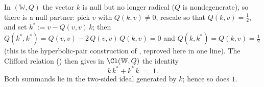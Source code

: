 In $(\mathbb{W}, Q)$ the vector $k$ is null but no longer radical ($Q$ is nondegenerate), so there is a null partner: pick $v$ with $Q(k, v) \neq 0$, rescale so that $Q(k,v) = \tfrac12$, and set $k^* := v - Q(v,v)\,k$; then $Q(k^*, k^*) = Q(v,v) - 2\,Q(v,v)\,Q(k,v) = 0$ and $Q(k, k^*) = Q(k,v) = \tfrac12$ (this is the hyperbolic-pair construction of \cite[\S 2.2]{ButlerT1}, reproved here in one line). The Clifford relation () then gives in $\Cl(\mathbb{W}, Q)$ the identity
\[
k\,k^* + k^*\,k \;=\; 1 .
\]
Both summands lie in the two-sided ideal generated by $k$; hence so does $1$.
